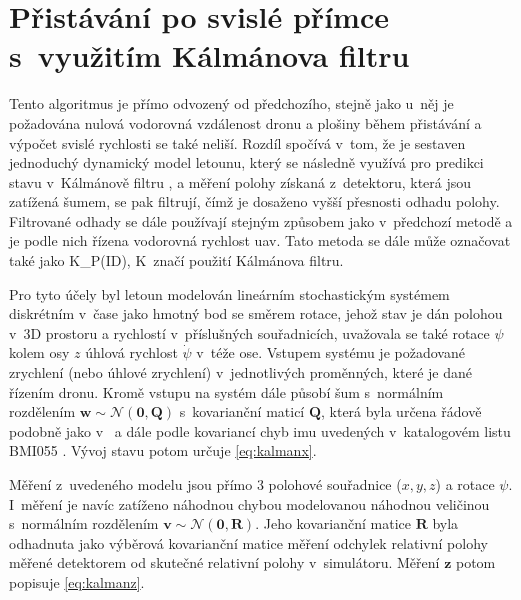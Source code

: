     \section{Přistávání po svislé přímce s~využitím Kálmánova filtru} \label{sec:kalmanoffboardpid}
        Tento algoritmus je přímo odvozený od předchozího, stejně jako u~něj je požadována nulová vodorovná vzdálenost dronu a plošiny během přistávání a výpočet svislé rychlosti se také neliší. Rozdíl spočívá v~tom, že je sestaven jednoduchý dynamický model letounu, který se následně využívá pro predikci stavu v~Kálmánově filtru \cite{Kalman1960}, \cite{Kalman1961} a měření polohy získaná z~detektoru, která jsou zatížená šumem, se pak filtrují, čímž je dosaženo vyšší přesnosti odhadu polohy. Filtrované odhady se dále používají stejným způsobem jako v~předchozí metodě a je podle nich řízena vodorovná rychlost \acrshort{uav}. Tato metoda se dále může označovat také jako K\_P(ID), K~značí použití Kálmánova filtru.

        Pro tyto účely byl letoun modelován lineárním stochastickým systémem diskrétním v~čase jako hmotný bod se směrem rotace, jehož stav je dán polohou v~3D prostoru a rychlostí v~příslušných souřadnicích, uvažovala se také rotace $\psi$ kolem osy $z$ úhlová rychlost $\dot \psi$ v~téže ose. Vstupem systému je požadované zrychlení (nebo úhlové zrychlení) v~jednotlivých proměnných, které je dané řízením dronu. Kromě vstupu na systém dále působí šum s~normálním rozdělením $\mathbf{w} \sim \mathcal{N}(\mathbf{0},\mathbf{Q})$ s~kovarianční maticí $\mathbf{Q}$, která byla určena řádově podobně jako v~\cite{Kojima2015} a dále podle kovariancí chyb \acrshort{imu} uvedených v~katalogovém listu BMI055 \cite{imu}.
        Vývoj stavu potom určuje \cref{eq:kalmanx}.

        Měření z~uvedeného modelu jsou přímo 3 polohové souřadnice ($x, y, z$) a rotace $\psi$. I~měření je navíc zatíženo náhodnou chybou modelovanou náhodnou veličinou s~normálním rozdělením $\mathbf{v} \sim \mathcal{N}(\mathbf{0},\mathbf{R})$. Jeho kovarianční matice $\mathbf{R}$ byla odhadnuta jako výběrová kovarianční matice měření odchylek relativní polohy měřené detektorem od skutečné relativní polohy v~simulátoru. Měření $\mathbf z$ potom popisuje \cref{eq:kalmanz}.

